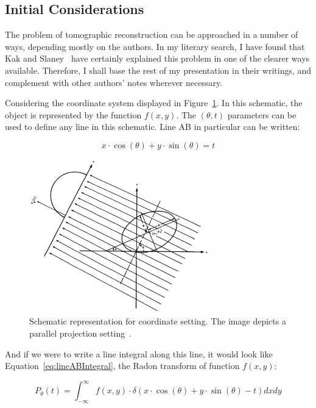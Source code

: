 \subsection{Initial Considerations}%
\label{sub:initial_considerations}

The problem of tomographic reconstruction can be approached in a number
of ways, depending mostly on the authors. In my literary search, I have
found that Kak and Slaney~\cite{Kak2001} have certainly explained this
problem in one of the clearer ways available. Therefore, I shall base
the rest of my presentation in their writings, and complement with other
authors' notes wherever necessary.

Considering the coordinate system displayed in
Figure~\ref{fig:coordinates}. In this schematic, the object is
represented by the function $f(x, y)$. The  $(\theta, t)$ parameters can
be used to define any line in this schematic. Line AB in particular can
be written:

\begin{equation}
    \label{eq:lineAB}
    x \cdot \cos(\theta) + y \cdot \sin(\theta) = t
\end{equation}

\begin{figure}[htpb]
    \centering
    \includegraphics[width=0.7\textwidth]{img/png/coordinates.png}
    \caption{Schematic representation for coordinate setting. The image
    depicts a parallel projection setting~\cite{Kak2001a}.}
    \label{fig:coordinates}
\end{figure}

And if we were to write a line integral along this line, it would look
like Equation~\ref{eq:lineABIntegral}, the Radon transform of function
$f(x, y)$:

\begin{equation}
    \label{eq:lineABIntegral}
    P_{\theta}(t) = \int_{-\infty}^{\infty} f(x, y) \cdot \delta(x \cdot
    \cos(\theta) + y \cdot \sin(\theta) - t) dxdy
\end{equation}

